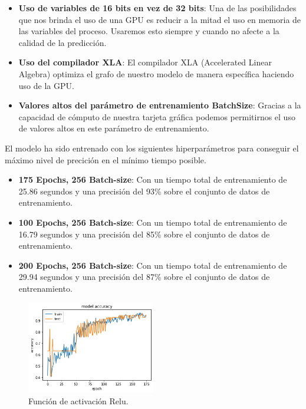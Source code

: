 \begin{itemize}
    \item \textbf{Uso de variables de 16 bits en vez de 32 bits}: Una de las posibilidades que nos brinda el uso de una GPU es reducir a la mitad el uso en memoria de las variables del proceso.
    Usaremos esto siempre y cuando no afecte a la calidad de la predicción.
    \item \textbf{Uso del compilador XLA}: El compilador XLA (Accelerated Linear Algebra) optimiza el grafo de nuestro modelo de manera específica haciendo uso de la GPU.
    \item \textbf{Valores altos del parámetro de entrenamiento BatchSize}: Gracias a la capacidad de cómputo de nuestra tarjeta gráfica podemos permitirnos el uso de valores altos en este parámetro de entrenamiento.
\end{itemize}

El modelo ha sido entrenado con los siguientes hiperparámetros para conseguir el máximo nivel de precición en el mínimo tiempo posible.
\begin{itemize}
    \item \textbf{175 Epochs, 256 Batch-size}: Con un tiempo total de entrenamiento de 25.86 segundos y una precisión del 93\% sobre el conjunto de datos de entrenamiento.
    \item \textbf{100 Epochs, 256 Batch-size}: Con un tiempo total de entrenamiento de 16.79 segundos y una precisión del 85\% sobre el conjunto de datos de entrenamiento.
    \item \textbf{200 Epochs, 256 Batch-size}: Con un tiempo total de entrenamiento de 29.94 segundos y una precisión del 87\% sobre el conjunto de datos de entrenamiento.
\end{itemize}
\iffalse
\begin{figure}
    \centering
    \includegraphics[width=0.5\textwidth]{images/chapter2/batch_256_175_epoch.png}
    \caption{Función de activación Relu.}
    \label{fig:Resultados de la precisión de entrenamiento con un batch-size de 256 y 175 epochs}
\end{figure}

